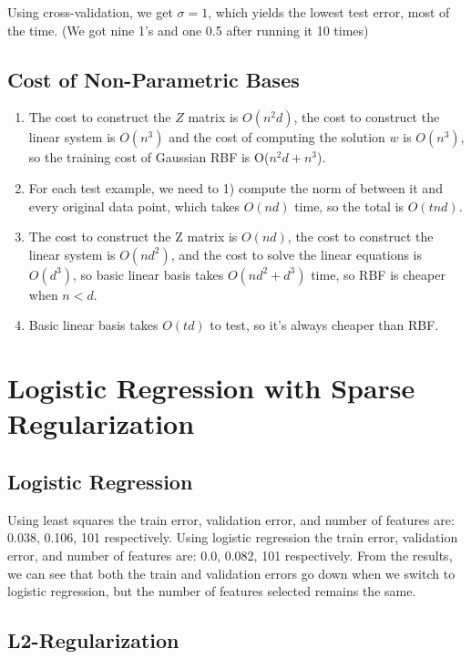 \documentclass{article}
\def\enum#1{\begin{enumerate}#1\end{enumerate}}
\begin{document}
Using cross-validation, we get $\sigma = 1$, which yields the lowest test error, most of the time. (We got nine 1's and one 0.5 after running it 10 times)


\subsection{Cost of Non-Parametric Bases}

\enum{
\item  The cost to construct the $Z$ matrix is $O(n^2d)$, the cost to construct the linear system is $O(n^3)$ and the cost of computing the solution $w$ is $O(n^3)$, so the training cost of Gaussian RBF is O($n^2d+n^3$).
\item For each test example, we need to 1) compute the norm of between it and every original data point, which takes $O(nd)$ time, so the total is $O(tnd)$.
\item  The cost to construct the Z matrix is $O(nd)$, the cost to construct the linear system is $O(nd^2)$, and the cost to solve the linear equations is $O(d^3)$, so basic linear basis takes $O(nd^2 + d^3)$ time, so RBF is cheaper when $ n < d$.
 \item  Basic linear basis takes $O(td)$ to test, so it's always cheaper than RBF.
}



\section{Logistic Regression with Sparse Regularization}

\subsection{Logistic Regression}

Using least squares the train error, validation error, and number of features are: 0.038, 0.106, 101 respectively. Using logistic regression the train error, validation error, and number of features are: 0.0, 0.082, 101 respectively. From the results, we can see that both the train and validation errors go down when we switch to logistic regression, but the number of features selected remains the same.

\subsection{L2-Regularization}
\end{document}
